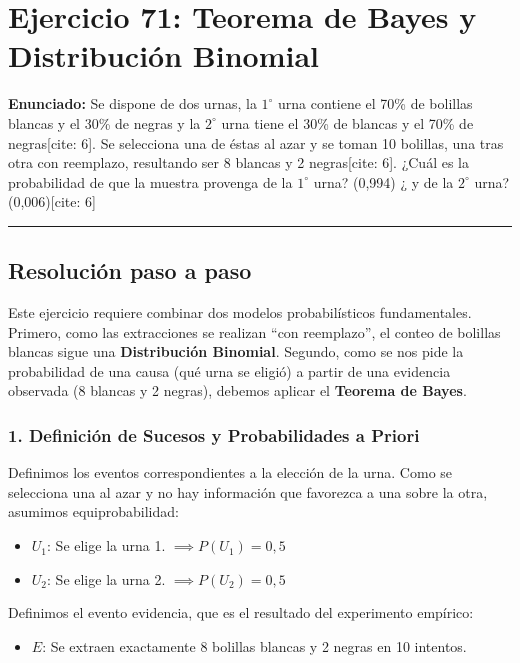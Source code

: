 \documentclass[11pt,a4paper]{article}
\begin{document}
\section*{Ejercicio 71: Teorema de Bayes y Distribución Binomial}

\textbf{Enunciado:} Se dispone de dos urnas, la $1^\circ$ urna contiene el 70\% de bolillas blancas y el 30\% de negras y la $2^\circ$ urna tiene el 30\% de blancas y el 70\% de negras[cite: 6]. Se selecciona una de éstas al azar y se toman 10 bolillas, una tras otra con reemplazo, resultando ser 8 blancas y 2 negras[cite: 6]. ¿Cuál es la probabilidad de que la muestra provenga de la $1^\circ$ urna? (0,994) ¿ y de la $2^\circ$ urna? (0,006)[cite: 6]

\vspace{0.5cm}
\hrule
\vspace{0.5cm}

\subsection*{Resolución paso a paso}

Este ejercicio requiere combinar dos modelos probabilísticos fundamentales. Primero, como las extracciones se realizan ``con reemplazo'', el conteo de bolillas blancas sigue una \textbf{Distribución Binomial}. Segundo, como se nos pide la probabilidad de una causa (qué urna se eligió) a partir de una evidencia observada (8 blancas y 2 negras), debemos aplicar el \textbf{Teorema de Bayes}.

\subsubsection*{1. Definición de Sucesos y Probabilidades a Priori}
Definimos los eventos correspondientes a la elección de la urna. Como se selecciona una al azar y no hay información que favorezca a una sobre la otra, asumimos equiprobabilidad:
\begin{itemize}
    \item $U_1$: Se elige la urna 1. $\implies P(U_1) = 0,5$
    \item $U_2$: Se elige la urna 2. $\implies P(U_2) = 0,5$
\end{itemize}

Definimos el evento evidencia, que es el resultado del experimento empírico:
\begin{itemize}
    \item $E$: Se extraen exactamente 8 bolillas blancas y 2 negras en 10 intentos.
\end{itemize}
\end{document}
